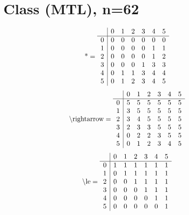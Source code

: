 \documentclass[11pt]{article}
\begin{document}
\section{Class (MTL), n=62}
\[\text{*} = 
\begin{array}{r | r r r r r r}
 & 0 & 1 & 2 & 3 & 4 & 5 \\ \hline
0 & 0 & 0 & 0 & 0 & 0 & 0 \\
1 & 0 & 0 & 0 & 0 & 1 & 1 \\
2 & 0 & 0 & 0 & 0 & 1 & 2 \\
3 & 0 & 0 & 0 & 1 & 3 & 3 \\
4 & 0 & 1 & 1 & 3 & 4 & 4 \\
5 & 0 & 1 & 2 & 3 & 4 & 5 \\
\end{array}
\]
\[\text{\textbackslash rightarrow} = 
\begin{array}{r | r r r r r r}
 & 0 & 1 & 2 & 3 & 4 & 5 \\ \hline
0 & 5 & 5 & 5 & 5 & 5 & 5 \\
1 & 3 & 5 & 5 & 5 & 5 & 5 \\
2 & 3 & 4 & 5 & 5 & 5 & 5 \\
3 & 2 & 3 & 3 & 5 & 5 & 5 \\
4 & 0 & 2 & 2 & 3 & 5 & 5 \\
5 & 0 & 1 & 2 & 3 & 4 & 5 \\
\end{array}
\]
\[\text{\textbackslash le} = 
\begin{array}{r | r r r r r r}
 & 0 & 1 & 2 & 3 & 4 & 5 \\ \hline
0 & 1 & 1 & 1 & 1 & 1 & 1 \\
1 & 0 & 1 & 1 & 1 & 1 & 1 \\
2 & 0 & 0 & 1 & 1 & 1 & 1 \\
3 & 0 & 0 & 0 & 1 & 1 & 1 \\
4 & 0 & 0 & 0 & 0 & 1 & 1 \\
5 & 0 & 0 & 0 & 0 & 0 & 1 \\
\end{array}
\]
\end{document}
